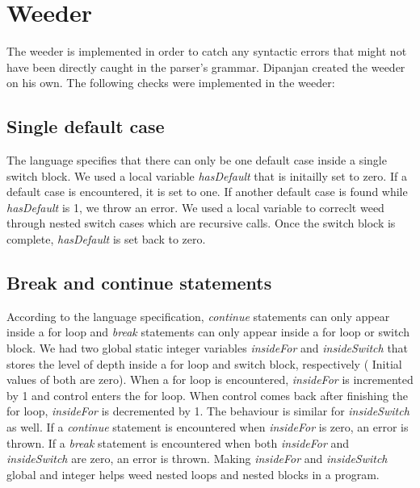 \documentclass[preprint,12pt]{elsarticle}
\begin{document}
\section{Weeder}

The weeder is implemented in order to catch any syntactic errors that might not have been directly caught in the parser's grammar. Dipanjan created the weeder on his own. The following checks were implemented in the weeder:

\subsection{Single default case}
The language specifies that there can only be one default case inside a single switch block. We used a local variable \textit{hasDefault} that is initailly set to zero. If a default case is encountered, it is set to one. If another default case is found while \textit{hasDefault} is 1, we throw an error. We used a local variable to correclt weed through nested switch cases which are recursive calls. Once the switch block is complete, \textit{hasDefault} is set back to zero.

\subsection{Break and continue statements}
According to the language specification, \textit{continue} statements can only appear inside a for loop and \textit{break} statements can only appear inside a for loop or switch block. We had two global static integer variables \textit{insideFor} and \textit{insideSwitch} that stores the level of depth inside a for loop and switch block, respectively ( Initial values of both are zero). When a for loop is encountered, \textit{insideFor} is incremented by 1 and control enters the for loop. When control comes back after finishing the for loop, \textit{insideFor} is decremented by 1. The behaviour is similar for \textit{insideSwitch} as well. If a \textit{continue} statement is encountered when \textit{insideFor} is zero, an error is thrown. If a \textit{break} statement is encountered when both \textit{insideFor} and \textit{insideSwitch} are zero, an error is thrown. Making \textit{insideFor} and \textit{insideSwitch} global and integer helps weed nested loops and nested blocks in a program.
\end{document}
